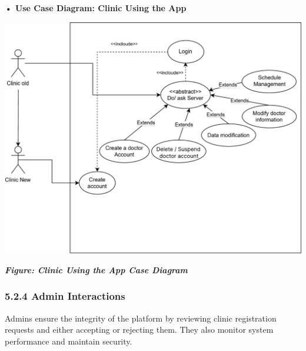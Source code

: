 \documentclass[12pt]{report}
\begin{document}
\vspace{0.5cm}
\noindent \textbf{• Use Case Diagram: Clinic Using the App}
\vspace{0.6cm}
\begin{center}
	\includegraphics[width=\textwidth]{images/clinicCAS.pdf} %
\end{center}
\vspace{-0.35cm}
\begin{center}
	\textit{\textbf{Figure: Clinic Using the App Case Diagram}}
\end{center}

\newpage
\subsubsection*{\textbf{5.2.4 Admin Interactions}}
Admins ensure the integrity of the platform by reviewing clinic registration requests and either accepting or rejecting them. They also monitor system performance and maintain security.
\end{document}
